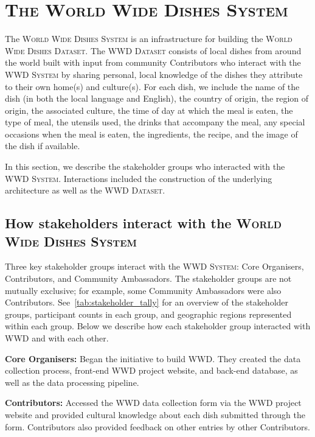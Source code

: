 \section{\textsc{The World Wide Dishes System}}\label{sec:system}

The \textsc{World Wide Dishes System} is an infrastructure for building the \textsc{World Wide Dishes Dataset}. The \textsc{WWD Dataset} consists of local dishes from around the world built with input from community Contributors who interact with the \textsc{WWD System} by sharing personal, local knowledge of the dishes they attribute to their own home(s) and culture(s). For each dish, we include the name of the dish (in both the local language and English), the country of origin, the region of origin, the associated culture, the time of day at which the meal is eaten, the type of meal, the utensils used, the drinks that accompany the meal, any special occasions when the meal is eaten, the ingredients, the recipe, and the image of the dish if available. 

In this section, we describe the stakeholder groups who interacted with the \textsc{WWD System}. Interactions included the construction of the underlying architecture as well as the \textsc{WWD Dataset}. 

\subsection{How stakeholders interact with the \textsc{World Wide Dishes System}}
Three key stakeholder groups interact with the \textsc{WWD System}: Core Organisers, Contributors, and Community Ambassadors. The stakeholder groups are not mutually exclusive; for example, some Community Ambassadors were also Contributors. See~\cref{tab:stakeholder_tally} for an overview of the stakeholder groups, participant counts in each group, and geographic regions represented within each group. Below we describe how each stakeholder group interacted with \textsc{WWD} and with each other. 


\textbf{Core Organisers:} Began the initiative to build \textsc{WWD}. They created the data collection process, front-end \textsc{WWD} project website, and back-end database, as well as the data processing pipeline. 

\textbf{Contributors:} Accessed the \textsc{WWD} data collection form via the \textsc{WWD} project website and provided cultural knowledge about each dish submitted through the form. Contributors also provided feedback on other entries by other Contributors.

